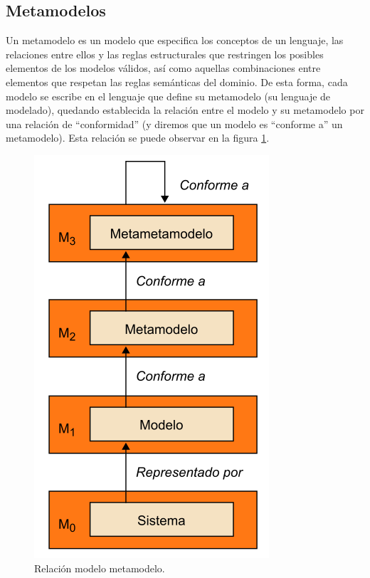 \subsection{Metamodelos}
\label{Metamodelos}

Un metamodelo es un modelo que especifica los conceptos de un lenguaje, las relaciones entre ellos y las reglas estructurales que restringen los posibles elementos de los modelos válidos, así como aquellas combinaciones entre elementos que respetan las reglas semánticas del dominio.
De esta forma, cada modelo se escribe en el lenguaje que define su metamodelo (su lenguaje de modelado), quedando establecida la relación entre el modelo y su metamodelo por una relación de “conformidad” (y diremos que un modelo es “conforme a” un metamodelo). Esta relación se puede observar en la figura \ref{fig:Relación modelo metamodelo}.

\begin{figure}[!h]
	\begin{center}
		\includegraphics [scale=0.40]{imagenes/Relacion_modelo_metamodelo.png}
	\end{center}
	\caption{Relación modelo metamodelo.}
	\label{fig:Relación modelo metamodelo}
\end{figure} 

